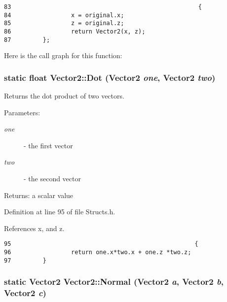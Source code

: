 \begin{Code}\begin{verbatim}83                                                     {
84                 x = original.x;
85                 z = original.z;
86                 return Vector2(x, z);
87         };
\end{verbatim}
\end{Code}




Here is the call graph for this function:\hypertarget{struct_vector2_b4153e2451dacbb95a6f86fd3ef387a4}{
\subsubsection[Dot]{\setlength{\rightskip}{0pt plus 5cm}static float Vector2::Dot ({\bf Vector2} {\em one}, \/  {\bf Vector2} {\em two})}}
\label{struct_vector2_b4153e2451dacbb95a6f86fd3ef387a4}


Returns the dot product of two vectors. 

\begin{Desc}
\item[Parameters:]
\begin{description}
\item[{\em one}]- the first vector \item[{\em two}]- the second vector \end{description}
\end{Desc}
\begin{Desc}
\item[Returns:]a scalar value \end{Desc}


Definition at line 95 of file Structs.h.

References x, and z.

\begin{Code}\begin{verbatim}95                                                    {
96                 return one.x*two.x + one.z *two.z;
97         }
\end{verbatim}
\end{Code}


\hypertarget{struct_vector2_3e174796c3f77a15999999800feff8ce}{
\subsubsection[Normal]{\setlength{\rightskip}{0pt plus 5cm}static {\bf Vector2} Vector2::Normal ({\bf Vector2} {\em a}, \/  {\bf Vector2} {\em b}, \/  {\bf Vector2} {\em c})}}
\label{struct_vector2_3e174796c3f77a15999999800feff8ce}


